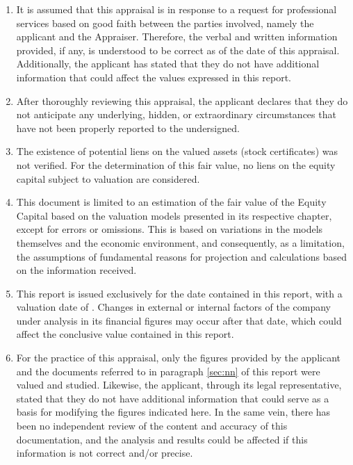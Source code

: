 




\begin{enumerate}[\indent a)]

\item It is assumed that this appraisal is in response to a request for professional services based on good faith between the parties involved, namely the applicant and the Appraiser. Therefore, the verbal and written information provided, if any, is understood to be correct as of the date of this appraisal. Additionally, the applicant has stated that they do not have additional information that could affect the values expressed in this report.

\item After thoroughly reviewing this appraisal, the applicant declares that they do not anticipate any underlying, hidden, or extraordinary circumstances that have not been properly reported to the undersigned.

\item  The existence of potential liens on the valued assets (stock certificates) was not verified. For the determination of this fair value, no liens on the equity capital subject to valuation are considered.

\item This document is limited to an estimation of the fair value of the Equity Capital based on the valuation models presented in its respective chapter, except for errors or omissions. This is based on variations in the models themselves and the economic environment, and consequently, as a limitation, the assumptions of fundamental reasons for projection and calculations based on the information received.


\item This report is issued exclusively for the date contained in this report, with a valuation date of \textcolor{principal}{\fechaInforme}. Changes in external or internal factors of the company under analysis in its financial figures may occur after that date, which could affect the conclusive value contained in this report.

\item For the practice of this appraisal, only the figures provided by the applicant and the documents referred to in paragraph \autoref{sec:nn} of this report were valued and studied. Likewise, the applicant, through its legal representative, stated that they do not have additional information that could serve as a basis for modifying the figures indicated here. In the same vein, there has been no independent review of the content and accuracy of this documentation, and the analysis and results could be affected if this information is not correct and/or precise.


\end{enumerate}
